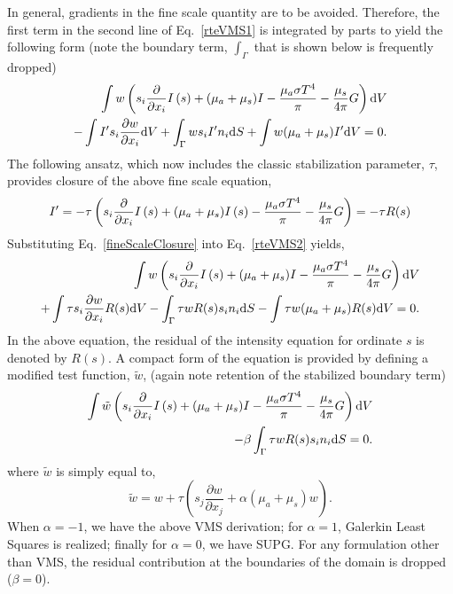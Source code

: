 In general, gradients in the fine scale quantity are to be avoided. Therefore, the first term
in the second line of Eq.~\ref{rteVMS1} is integrated by parts to yield the following
form (note the boundary term, $\int_\Gamma$ that is shown below is frequently dropped)
\begin{eqnarray}
   \int w \left( s_i {{\partial} \over {\partial x_i}} I\left(s\right)
   + (\mu_a +\mu_s)I - {{\mu_a \sigma T^4} \over {\pi}} -\frac{\mu_s}{4\pi}G \right) {\rm d}V  \nonumber \\ 
   - \int I' s_i {{\partial w} \over {\partial x_i}} {\rm d}V 
   + \int_{\Gamma} w s_i I' n_i {\rm d}S + \int w (\mu_a + \mu_s)I' {\rm d}V  = 0.
\label{rteVMS2}
\end{eqnarray}
The following ansatz, which now includes the classic stabilization parameter, $\tau$,
provides closure of the above fine scale equation,
\begin{equation}
   I' = -\tau\left(s_i {{\partial} \over {\partial x_i}} I\left(s\right) + (\mu_a + \mu_s)I\left(s\right) 
   - {{\mu_a \sigma T^4} \over {\pi}} -\frac{\mu_s}{4\pi}G \right) = -\tau R(s)
\label{fineScaleClosure}
\end{equation}
%
 Substituting Eq.~\ref{fineScaleClosure} into Eq.~\ref{rteVMS2} yields,
\begin{eqnarray}
   \int w \left( s_i {{\partial} \over {\partial x_i}} I\left(s\right)
   + (\mu_a +\mu_s)I - {{\mu_a \sigma T^4} \over {\pi}} -\frac{\mu_s}{4\pi}G \right) {\rm d}V  \nonumber \\ 
   + \int \tau s_i {{\partial w} \over {\partial x_i}} R(s) {\rm d}V 
   - \int_\Gamma \tau w R(s) s_i n_i {\rm d}S - \int \tau w (\mu_a + \mu_s)R(s) {\rm d}V  = 0.
\label{rteVMS3}
\end{eqnarray}
In the above equation, the residual of the intensity equation for ordinate $s$
is denoted by $R(s)$. A compact form of the equation is provided by defining a modified
test function, $\tilde w$, (again note retention of the stabilized boundary term)
\begin{eqnarray}
   \int \tilde w \left( s_i {{\partial} \over {\partial x_i}} I\left(s\right)
   + (\mu_a + \mu_s)I - {{\mu_a \sigma T^4} \over {\pi}} -\frac{\mu_s}{4\pi}G \right) {\rm d}V \nonumber \\
 - \beta \int_\Gamma \tau w R(s) s_i n_i {\rm d}S = 0.
\label{rteVMSCompact}
\end{eqnarray}
where $\tilde w$ is simply equal to,
\begin{equation}
   \tilde w  = w + \tau \left( s_j \frac{\partial w }{\partial x_j} + \alpha (\mu_a + \mu_s)w \right).
\label{modW}
\end{equation}
When $\alpha = -1$, we have the above VMS derivation; for $\alpha = 1$, Galerkin Least Squares is realized;
finally for $\alpha = 0$, we have SUPG. For any formulation other than VMS, the residual contribution
at the boundaries of the domain is dropped ($\beta = 0$).

